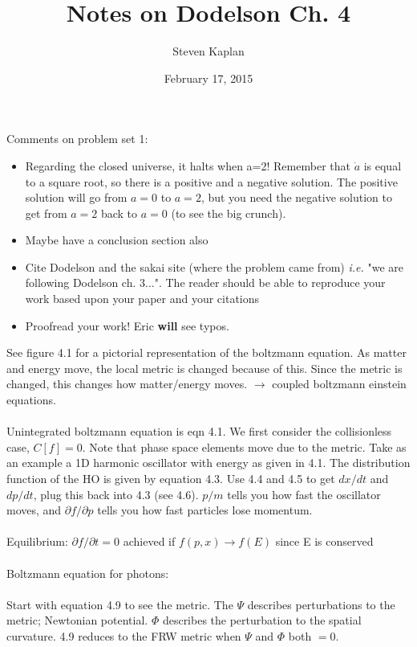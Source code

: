 \documentclass{article}
\title{Notes on Dodelson Ch. 4}
\author{Steven Kaplan}
\date{February 17, 2015}
\begin{document}
\maketitle
Comments on problem set 1:
\begin{itemize}
\item Regarding the closed universe, it halts when a=2!  Remember that $\dot{a}$ is equal to a square root, so there is a positive and a negative solution.  The positive solution will go from $a=0$ to $a=2$, but you need the negative solution to get from $a=2$ back to $a=0$ (to see the big crunch).
\item Maybe have a conclusion section also
\item Cite Dodelson and the sakai site (where the problem came from) \emph{i.e.} "we are following Dodelson ch. 3...".  The reader should be able to reproduce your work based upon your paper and your citations
\item Proofread your work!  Eric {\bf will} see typos.
\end{itemize}
See figure 4.1 for a pictorial representation of the boltzmann equation.  As matter and energy move, the local metric is changed because of this.  Since the metric is changed, this changes how matter/energy moves.  $\longrightarrow$ coupled boltzmann einstein equations.
\\ \\
Unintegrated boltzmann equation is eqn 4.1.  We first consider the collisionless case, $C[f]=0$.  Note that phase space elements move due to the metric.  Take as an example a 1D harmonic oscillator with energy as given in 4.1.  The distribution function of the HO is given by equation 4.3.  Use 4.4 and 4.5 to get $dx/dt$ and $dp/dt$, plug this back into 4.3 (see 4.6).  $p/m$ tells you how fast the oscillator moves, and $\partial f/\partial p$ tells you how fast particles lose momentum.
\\ \\
Equilibrium: $\partial f/ \partial t=0$ achieved if $f(p,x)\rightarrow f(E)$ since E is conserved
\\ \\
Boltzmann equation for photons:
\\ \\
Start with equation 4.9 to see the metric.  The $\Psi$ describes perturbations to the metric; Newtonian potential.  $\Phi$ describes the perturbation to the spatial curvature.  4.9 reduces to the FRW metric when $\Psi$ and $\Phi$ both $=0$.
\\ \\
\end{document}
